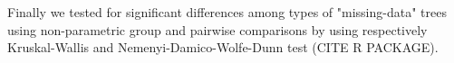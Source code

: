 \documentclass[12pt,letterpaper]{article}
\begin{document}

Finally we tested for significant differences among types of "missing-data" trees using non-parametric group and pairwise comparisons by using respectively Kruskal-Wallis and Nemenyi-Damico-Wolfe-Dunn test (CITE R PACKAGE)\citet{ruxtontime2008}.




\end{document}
